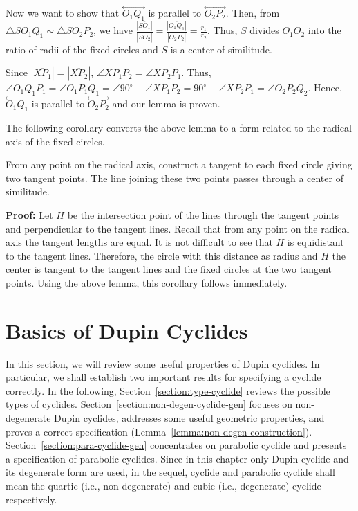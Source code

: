     Now we want to show that $\stackrel{\longleftrightarrow}{O_1Q_1}$ is
parallel to $\stackrel{\longleftrightarrow}{O_2P_2}$.  Then, from
$\bigtriangleup SO_1Q_1\sim\bigtriangleup SO_2P_2$, we have
$\frac{|\overline{SO_1}|}{|\overline{SO_2}|}=
\frac{|\overline{O_1Q_1}|}{|\overline{O_2P_2}|}=\frac{r_1}{r_2}$.
Thus, $S$ divides $\overline{O_1O_2}$ into the ratio of radii of the fixed
circles and $S$ is a center of similitude.

     Since $|\overline{XP_1}|=|\overline{XP_2}|$, 
$\angle XP_1P_2=\angle XP_2P_1$.  Thus, $\angle O_1Q_1P_1=\angle O_1P_1Q_1=
\angle 90^\circ-\angle XP_1P_2=90^\circ-\angle XP_2P_1=\angle O_2P_2Q_2$.
Hence, $\stackrel{\longleftrightarrow}{O_1Q_1}$ is parallel to 
$\stackrel{\longleftrightarrow}{O_2P_2}$ and our lemma is proven. \QED

     The following corollary converts the above lemma to a form related to 
the radical axis of the fixed circles.

\begin{corollary}
\label{cor:tangent-center}
     From any point on the radical axis, construct a tangent to each fixed
circle giving two tangent points.  The line joining these two points passes
through a center of similitude.
\end{corollary}
{\bf Proof:}  Let $H$ be the intersection point of the lines through the
tangent points and perpendicular to the tangent lines.  Recall that from any 
point on the radical axis the tangent lengths are equal.  
It is not difficult to see that $H$ is equidistant to the tangent lines.
Therefore, the circle with this distance as radius and $H$ the center is
tangent to the tangent lines and the fixed circles at the two tangent points.  
Using the above lemma, this corollary follows immediately. \QED


\section{Basics of Dupin Cyclides}
\label{section:basic}

     In this section, we will review some useful properties of Dupin cyclides.
In particular, we shall establish two important results for specifying 
a cyclide correctly.  In the following, Section~\ref{section:type-cyclide} 
reviews the possible types of cyclides. 
Section~\ref{section:non-degen-cyclide-gen} focuses on non-degenerate Dupin 
cyclides, addresses some useful geometric properties,
and proves a correct specification
(Lemma~\ref{lemma:non-degen-construction}).
Section~\ref{section:para-cyclide-gen} concentrates on parabolic cyclide and
presents a specification of parabolic cyclides.
Since in this chapter only Dupin cyclide and its degenerate form are used, in
the sequel, cyclide and parabolic cyclide shall mean the quartic (i.e.,
non-degenerate) and cubic (i.e., degenerate) cyclide respectively.

